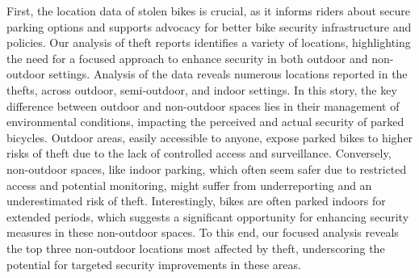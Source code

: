 \documentclass[
  11pt,
]{article}
\begin{document}
\indent First, the location data of stolen bikes is crucial, as it
informs riders about secure parking options and supports advocacy for
better bike security infrastructure and policies. Our analysis of theft
reports identifies a variety of locations, highlighting the need for a
focused approach to enhance security in both outdoor and non-outdoor
settings. Analysis of the data reveals numerous locations reported in
the thefts, across outdoor, semi-outdoor, and indoor settings. In this
story, the key difference between outdoor and non-outdoor spaces lies in
their management of environmental conditions, impacting the perceived
and actual security of parked bicycles. Outdoor areas, easily accessible
to anyone, expose parked bikes to higher risks of theft due to the lack
of controlled access and surveillance. Conversely, non-outdoor spaces,
like indoor parking, which often seem safer due to restricted access and
potential monitoring, might suffer from underreporting and an
underestimated risk of theft. Interestingly, bikes are often parked
indoors for extended periods, which suggests a significant opportunity
for enhancing security measures in these non-outdoor spaces. To this
end, our focused analysis reveals the top three non-outdoor locations
most affected by theft, underscoring the potential for targeted security
improvements in these areas.
\end{document}
